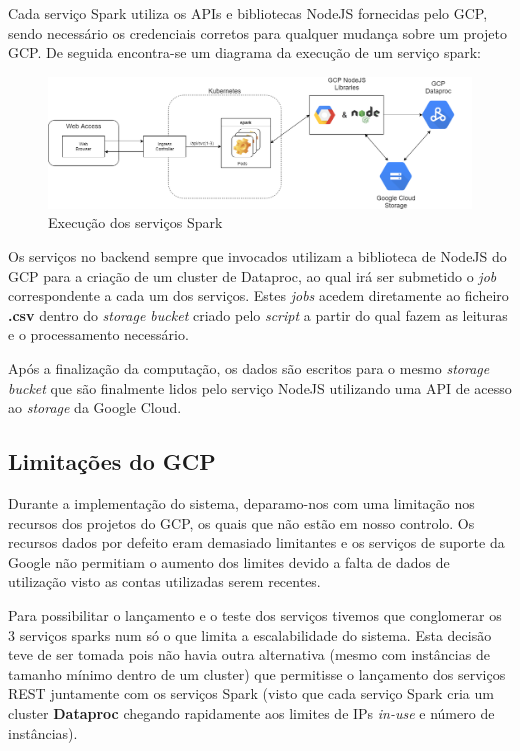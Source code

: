 \documentclass[11pt,a4paper]{article}
\begin{document}
Cada serviço Spark utiliza os APIs e bibliotecas NodeJS fornecidas pelo GCP, sendo necessário os credenciais corretos para qualquer mudança sobre um projeto GCP. De seguida encontra-se um diagrama da execução de um serviço spark:

\begin{figure}[H]
  \centering
  \includegraphics[scale=0.32]{spark_ex.png}
  \caption{Execução dos serviços Spark}
\end{figure}

Os serviços no backend sempre que invocados utilizam a biblioteca de NodeJS do GCP para a criação de um cluster de Dataproc, ao qual irá ser submetido o \textit{job} correspondente a cada um dos serviços. Estes \textit{jobs} acedem diretamente ao ficheiro \textbf{.csv} dentro do \textit{storage bucket} criado pelo \textit{script} a partir do qual fazem as leituras e o processamento necessário. 

Após a finalização da computação, os dados são escritos para o mesmo \textit{storage bucket} que são finalmente lidos pelo serviço NodeJS utilizando uma API de acesso ao \textit{storage} da Google Cloud.

\subsection{Limitações do GCP}
Durante a implementação do sistema, deparamo-nos com uma limitação nos recursos dos projetos do GCP, os quais que não estão em nosso controlo. Os recursos dados por defeito eram demasiado limitantes e os serviços de suporte da Google não permitiam o aumento dos limites devido a falta de dados de utilização visto as contas utilizadas serem recentes.

Para possibilitar o lançamento e o teste dos serviços tivemos que conglomerar os 3 serviços sparks num só o que limita a escalabilidade do sistema. Esta decisão teve de ser tomada pois não havia outra alternativa (mesmo com instâncias de tamanho mínimo dentro de um cluster) que permitisse o lançamento dos serviços REST juntamente com os serviços Spark (visto que cada serviço Spark cria um cluster \textbf{Dataproc} chegando rapidamente aos limites de IPs \textit{in-use} e número de instâncias).
\end{document}
